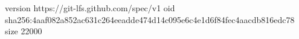 version https://git-lfs.github.com/spec/v1
oid sha256:4aaf082a852ac631c264eeadde474d14c095e6c4e1d6f84fec4aacdb816edc78
size 22000
